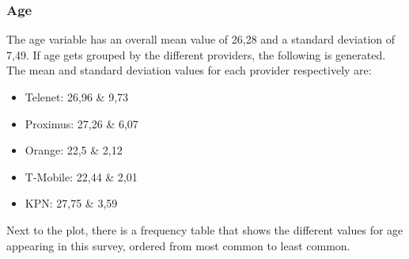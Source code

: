 \subsubsection{Age}
The age variable has an overall mean value of 26,28 and a standard deviation of 7,49. If age gets grouped by the different providers, the following is generated. The mean and standard deviation values for each provider respectively are:
\begin{itemize}
	\item Telenet: 26,96 \& 9,73
	\item Proximus: 27,26 \& 6,07
	\item Orange: 22,5 \& 2,12
	\item T-Mobile: 22,44 \& 2,01
	\item KPN: 27,75 \& 3,59
\end{itemize}
Next to the plot, there is a frequency table that shows the different values for age appearing in this survey, ordered from most common to least common.
